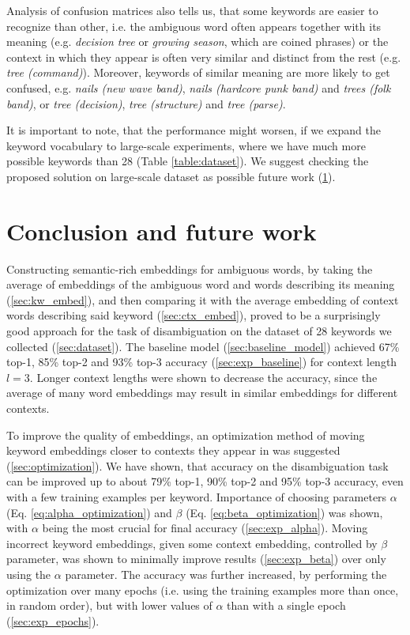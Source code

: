 \documentclass{llncs}
\begin{document}
Analysis of confusion matrices also tells us, that some keywords are easier to recognize than other, i.e. the ambiguous word often appears together with its meaning (e.g. \textit{decision tree} or \textit{growing season}, which are coined phrases) or the context in which they appear is often very similar and distinct from the rest (e.g. \textit{tree (command)}).
Moreover, keywords of similar meaning are more likely to get confused, e.g. \textit{nails (new wave band)}, \textit{nails (hardcore punk band)} and \textit{trees (folk band)}, or \textit{tree (decision)}, \textit{tree (structure)} and \textit{tree (parse)}.

It is important to note, that the performance might worsen, if we expand the keyword vocabulary to large-scale experiments, where we have much more possible keywords than 28 (Table \ref{table:dataset}).
We suggest checking the proposed solution on large-scale dataset as possible future work (\ref{sec:conclusion}).


\section{Conclusion and future work}
\label{sec:conclusion}
Constructing semantic-rich embeddings for ambiguous words, by taking the average of embeddings of the ambiguous word and words describing its meaning (\ref{sec:kw_embed}), and then comparing it with the average embedding of context words describing said keyword (\ref{sec:ctx_embed}), proved to be a surprisingly good approach for the task of disambiguation on the dataset of 28 keywords we collected (\ref{sec:dataset}).
The baseline model (\ref{sec:baseline_model}) achieved 67\% top-1, 85\% top-2 and 93\% top-3 accuracy (\ref{sec:exp_baseline}) for context length \(l=3\). Longer context lengths were shown to decrease the accuracy, since the average of many word embeddings may result in similar embeddings for different contexts.

To improve the quality of embeddings, an optimization method of moving keyword embeddings closer to contexts they appear in was suggested (\ref{sec:optimization}).
We have shown, that accuracy on the disambiguation task can be improved up to about 79\% top-1, 90\% top-2 and 95\% top-3 accuracy, even with a few training examples per keyword.
Importance of choosing parameters \(\alpha\) (Eq. \ref{eq:alpha_optimization}) and \(\beta\) (Eq. \ref{eq:beta_optimization}) was shown, with \(\alpha\) being the most crucial for final accuracy (\ref{sec:exp_alpha}).
Moving incorrect keyword embeddings, given some context embedding, controlled by \(\beta\) parameter, was shown to  minimally improve results (\ref{sec:exp_beta}) over only using the \(\alpha\) parameter.
The accuracy was further increased, by performing the optimization over many epochs (i.e. using the training examples more than once, in random order), but with lower values of \(\alpha\) than with a single epoch (\ref{sec:exp_epochs}).
\end{document}
